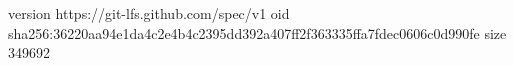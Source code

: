 version https://git-lfs.github.com/spec/v1
oid sha256:36220aa94e1da4c2e4b4c2395dd392a407ff2f363335ffa7fdec0606c0d990fe
size 349692

